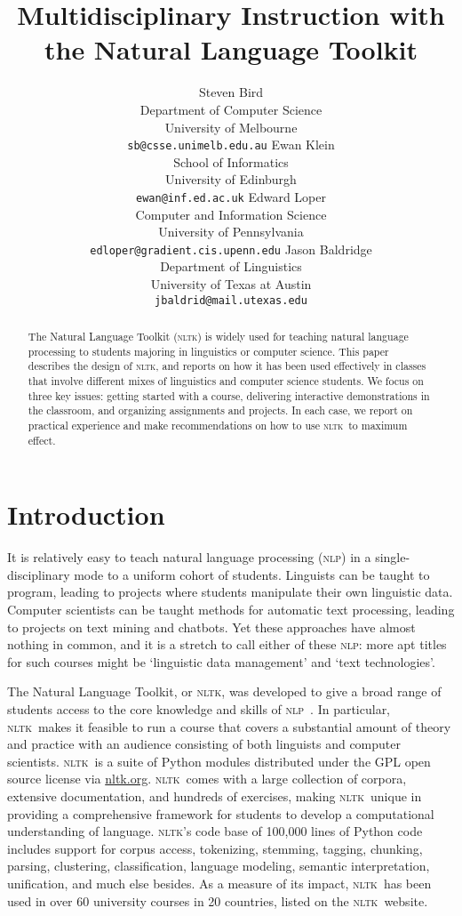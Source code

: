 \documentclass[11pt]{article}
\title{Multidisciplinary Instruction with the Natural Language Toolkit}
\author{Steven Bird \\
  Department of Computer Science\\
  University of Melbourne\\
  {\small\tt sb@csse.unimelb.edu.au} \And
  Ewan Klein\\
  School of Informatics\\
  University of Edinburgh\\
  {\small\tt ewan@inf.ed.ac.uk} \AND
  Edward Loper\\
  Computer and Information Science\\
  University of Pennsylvania\\
  {\small\tt edloper@gradient.cis.upenn.edu} \And
  Jason Baldridge\\
  Department of Linguistics\\
  University of Texas at Austin\\
  {\small\tt jbaldrid@mail.utexas.edu}
}
\date{}
\newcommand{\NLP}{\textsc{nlp}}
\newcommand{\NLTK}{\textsc{nltk}}
\begin{document}
\maketitle

\begin{abstract}
  The Natural Language Toolkit (\NLTK) is widely used for teaching
  natural language processing to students majoring in linguistics or
  computer science.  This paper describes the design of \NLTK, and
  reports on how it has been used effectively in classes that involve
  different mixes of
  linguistics and computer science students.  We focus
  on three key issues: getting started with a course, delivering
  interactive demonstrations in the classroom,
  and organizing assignments and projects.
  In each case, we report on practical experience and make
  recommendations on how to use \NLTK\ to maximum effect.
\end{abstract}

\section{Introduction}

It is relatively easy to teach natural language processing (\NLP) in a
single-disciplinary mode to a uniform cohort of students.  Linguists
can be taught to program, leading to projects where students
manipulate their own linguistic data.  Computer scientists can be
taught methods for automatic text processing, leading to projects on
text mining and chatbots.  Yet these approaches have almost nothing in
common, and it is a stretch to call either of these \NLP: more apt
titles for such courses might be `linguistic data management' and
`text technologies'.

The Natural Language Toolkit, or \NLTK, was
developed to give a broad range of students access to the core
knowledge and skills of \NLP\ \cite{LoperBird02}.  In particular, \NLTK\ makes it feasible
to run a course that covers a substantial amount of theory and
practice with an audience consisting of both linguists and computer
scientists.  \NLTK\ is a suite of Python modules distributed under the
GPL open source license via \url{nltk.org}.  \NLTK\ comes with a large collection of
corpora, extensive documentation, and hundreds of exercises, making
\NLTK\ unique in providing a comprehensive framework for students to
develop a computational understanding of language.  \NLTK's code base
of 100,000 lines of Python code includes support for corpus access,
tokenizing, stemming, tagging, chunking, parsing, clustering,
classification, language modeling, semantic interpretation,
unification, and much else besides.  As a measure of its
impact, \NLTK\ has been used in over 60 university courses in 20
countries, listed on the \NLTK\ website.
\end{document}
